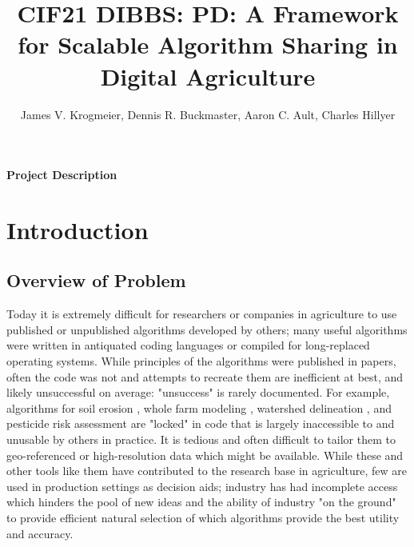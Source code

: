 \documentclass[11pt]{article}
\title{{\large\bf CIF21 DIBBS: PD: A Framework for Scalable Algorithm Sharing in Digital Agriculture}}
\author{
James V. Krogmeier,
Dennis R. Buckmaster,
Aaron C. Ault,
Charles Hillyer
}
\begin{document}
\noindent\textbf{\Large Project Description}\\

\section{Introduction} 
\label{sec:intro}

\subsection{Overview of Problem}
\label{ssec:OverviewOfProblem}

Today it is extremely difficult for researchers or companies in agriculture to use published or unpublished algorithms 
developed by others; many useful algorithms were written in antiquated coding languages or compiled for long-replaced 
operating systems. While principles of the algorithms were published in papers, often the code was not and attempts to 
recreate them are inefficient at best, and likely unsuccessful on average: "unsuccess" is rarely documented. For example, 
algorithms for soil erosion \cite{ARS:14}, whole farm modeling \cite{Rotz:16}, watershed delineation \cite{Djokic:00}, 
and pesticide risk assessment \cite{Antony:12} are "locked" in code that is largely inaccessible to and unusable by 
others in practice.  It is tedious and often difficult to tailor them to geo-referenced or high-resolution data which might be 
available.  While these and other tools like them have contributed to the research base in agriculture, few are used in 
production settings as decision aids; industry has had incomplete access which hinders the pool of new ideas and the ability 
of industry "on the ground" to provide efficient natural selection of which algorithms provide the best utility and accuracy. 
\end{document}
